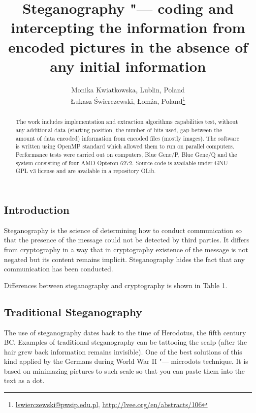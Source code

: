 \documentclass[10pt, a5paper]{article}
\begin{document}
\title{Steganography "--- coding and intercepting the information from encoded pictures in the absence of any initial information}
\author{Monika Kwiatkowska, Lublin, Poland \\ \L{}ukasz \'S{}wierczewski, \L{}om\.z{}a, Poland\footnote{\url{lswierczewski@pwsip.edu.pl}, \url{http://lvee.org/en/abstracts/106}}}
\maketitle
\begin{abstract}
The work includes implementation and extraction algorithms capabilities test, without any additional data (starting position, the number of bits used, gap between the amount of data encoded) information from encoded files (mostly images). The software is written using OpenMP standard which allowed them to run on parallel computers. Performance tests were carried out on computers, Blue Gene/P, Blue Gene/Q and the system consisting of four AMD Opteron 6272. Source code is available under GNU GPL v3 license and are available in a repository OLib.
\end{abstract}
\subsection*{Introduction}

Steganography is the science of determining how to conduct commu\-ni\-ca\-tion so that the presence of the message could not be detected by third parties. It differs from cryptography in a way that in cryptography existence of the message is not negated but its content remains implicit. Steganography hides the fact that any communication has been con\-duct\-ed.

Differences between steganography and cryptography is shown in Table 1.

\subsection*{Traditional Steganography}
The use of steganography dates back to the time of Herodotus, the fifth century BC. Examples of traditional steganography can be tattooing the scalp (after the hair grew back information remains in\-vi\-sible). One of the best solutions of this kind applied by the Germans during World War II "--- microdots technique. It is based on minimazing  pictures to such scale so that you can paste them into the text as a dot.
\end{document}
